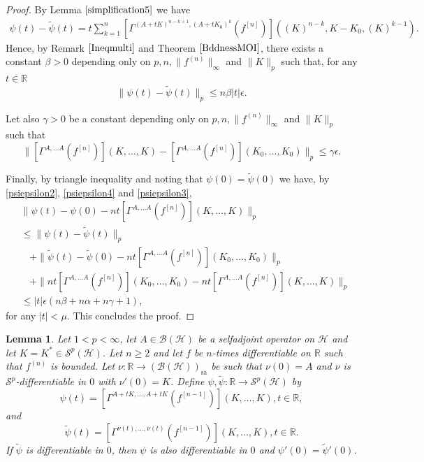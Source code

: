\documentclass[12pt]{amsart}
\newtheorem{lemma}[theorem]{Lemma}
\theoremstyle{remark}
\begin{document}
\begin{proof}
By Lemma $\ref{simplification5}$ we have
\begin{align*}
\psi(t) - \tilde{\psi}(t) = t \sum_{k=1}^{n} \left[ \Gamma^{(A+tK)^{n-k+1}, (A+tK_0)^k}(f^{[n]})\right]((K)^{n-k}, K-K_0, (K)^{k-1}).
\end{align*}
Hence, by Remark $\ref{Ineqmulti}$ and Theorem $\ref{BddnessMOI}$, there exists a constant $\beta>0$ depending only on $p, n, \|f^{(n)}\|_{\infty}$ and $\|K\|_p$ such that, for any $t\in \mathbb{R}$
\begin{equation}\label{psiepsilon2}
\| \psi(t) - \tilde{\psi}(t) \|_p \leq n \beta |t| \epsilon.
\end{equation}

Let also $\gamma>0$ be a constant depending only on $p, n, \|f^{(n)}\|_{\infty}$ and $\|K\|_p$ such that
\begin{equation}\label{psiepsilon3}
\| \left[\Gamma^{A, \ldots A}(f^{[n]}) \right](K, \ldots, K) - \left[\Gamma^{A, \ldots A}(f^{[n]}) \right](K_0, \ldots, K_0) \|_p \leq \gamma \epsilon.
\end{equation}

Finally, by triangle inequality and noting that $\psi(0) = \tilde{\psi}(0)$ we have, by \eqref{psiepsilon2}, \eqref{psiepsilon4} and \eqref{psiepsilon3}, 
\begin{align*}
& \| \psi(t) - \psi(0) - n t \left[\Gamma^{A, \ldots A}(f^{[n]}) \right](K, \ldots, K) \|_p \\
& \leq \| \psi(t) - \tilde{\psi}(t)\|_p \\
& \ \ \ \ + \| \tilde{\psi}(t) - \tilde{\psi}(0) - n t \left[\Gamma^{A, \ldots A}(f^{[n]}) \right](K_0, \ldots, K_0)\|_p \\
& \ \ \ \ + \| n t \left[\Gamma^{A, \ldots A}(f^{[n]}) \right](K_0, \ldots, K_0) - nt \left[\Gamma^{A, \ldots A}(f^{[n]}) \right](K, \ldots, K) \|_p \\
& \leq |t| \epsilon (n\beta + n\alpha + n\gamma  + 1),
\end{align*}
for any $|t| < \mu$. This concludes the proof.

\end{proof}


\begin{lemma}\label{simplification4}
Let $1 < p < \infty$, let $A \in \mathcal{B}(\mathcal{H})$ be a selfadjoint operator on $\mathcal{H}$ and let $K=K^* \in \mathcal{S}^p(\mathcal{H})$. Let $n\geq 2$ and let $f$ be $n$-times differentiable on $\mathbb{R}$ such that $f^{(n)}$ is bounded. Let $\nu : \mathbb{R} \to (\mathcal{B}(\mathcal{H}))_{\text{sa}}$ be such that $\nu(0)=A$ and $\nu$ is $\mathcal{S}^p$-differentiable in $0$ with $\nu'(0)=K$. Define $\psi, \tilde{\psi} : \mathbb{R} \to \mathcal{S}^p(\mathcal{H})$ by
$$
\psi(t) = \left[ \Gamma^{A+tK,\ldots,A+tK}(f^{[n-1]}) \right](K, \ldots, K), t\in \mathbb{R},
$$
and
$$
\tilde{\psi}(t) = \left[ \Gamma^{\nu(t),\ldots,\nu(t)}(f^{[n-1]}) \right](K, \ldots, K), t\in \mathbb{R}.
$$
If $\tilde{\psi}$ is differentiable in $0$, then $\psi$ is also differentiable in $0$ and $\psi'(0) = \tilde{\psi}'(0)$.
\end{lemma}
\end{document}

